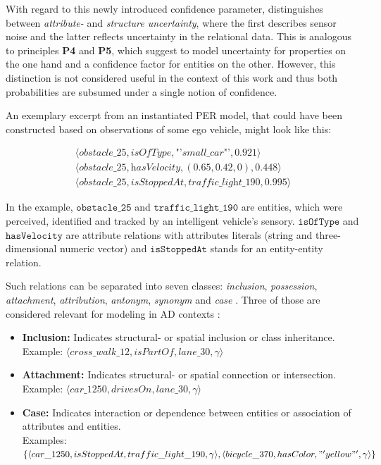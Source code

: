 With regard to this newly introduced confidence parameter, \cite{Petrich2018} distinguishes between \textit{attribute-} and \textit{structure uncertainty}, where the first describes sensor noise and the latter reflects uncertainty in the relational data. This is analogous to principles \textbf{P4} and \textbf{P5}, which suggest to model uncertainty for properties on the one hand and a confidence factor for entities on the other. However, this distinction is not considered useful in the context of this work and thus both probabilities are subsumed under a single notion of confidence.

An exemplary excerpt from an instantiated PER model, that could have been constructed based on observations of some ego vehicle, might look like this:

\begin{gather*}
	\langle \textit{obstacle\_25}, \textit{isOfType}, \textit{"'small\_car"'}, 0.921 \rangle \\
	\langle \textit{obstacle\_25}, \textit{hasVelocity}, (0.65, 0.42, 0), 0.448 \rangle \\
	\langle \textit{obstacle\_25}, \textit{isStoppedAt}, \textit{traffic\_light\_190}, 0.995 \rangle
\end{gather*}

In the example, $\texttt{obstacle\_25}$ and $\texttt{traffic\_light\_190}$ are entities, which were perceived, identified and tracked by an intelligent vehicle's sensory. $\texttt{isOfType}$ and $\texttt{hasVelocity}$ are attribute relations with attributes literals (string and three-dimensional numeric vector) and $\texttt{isStoppedAt}$ stands for an entity-entity relation.

Such relations can be separated into seven classes: \textit{inclusion}, \textit{possession}, \textit{attachment}, \textit{attribution}, \textit{antonym}, \textit{synonym} and \textit{case} \cite{Storey1993}. Three of those are considered relevant for modeling in AD contexts \cite{Petrich2018}:

\begin{itemize}
	\item \textbf{Inclusion:} Indicates structural- or spatial inclusion or class inheritance. \\ Example: $\langle  cross\_walk\_12, isPartOf, lane\_30, \gamma \rangle$
	\item \textbf{Attachment:} Indicates structural- or spatial connection or intersection. \\ Example: $\langle car\_1250, drivesOn, lane\_30, \gamma \rangle$
	\item \textbf{Case:} Indicates interaction or dependence between entities or association of attributes and entities. \\ Examples: $\{ \langle car\_1250, isStoppedAt, traffic\_light\_190, \gamma \rangle, \langle bicycle\_370, hasColor, \\ "'yellow"', \gamma \rangle \}$
\end{itemize}

